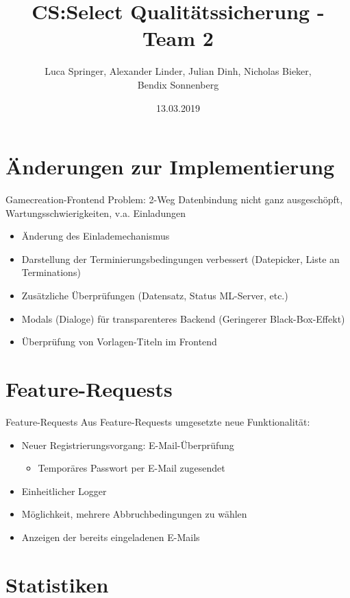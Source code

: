 \documentclass[xcolor=dvipsnames]{beamer}
\title[Team 2 - Implementierung]{CS:Select Qualitätssicherung - Team 2}
\author{Luca Springer, Alexander Linder, Julian Dinh, Nicholas Bieker,\\ Bendix Sonnenberg}
\date{13.03.2019}
\begin{document}
\begin{frame} %
  \titlepage
\end{frame}

\section{Änderungen zur Implementierung}
\begin{frame}{Gamecreation-Frontend}
    Problem: 2-Weg Datenbindung nicht ganz ausgeschöpft, Wartungsschwierigkeiten, v.a. Einladungen
    \begin{itemize}
        \item Änderung des Einlademechanismus
        \item Darstellung der Terminierungsbedingungen verbessert (Datepicker, Liste an Terminations)
        \item Zusätzliche Überprüfungen (Datensatz, Status ML-Server, etc.)
        \item Modals (Dialoge) für transparenteres Backend (Geringerer Black-Box-Effekt)
        \item Überprüfung von Vorlagen-Titeln im Frontend
    \end{itemize}
\end{frame}

\section{Feature-Requests}
\begin{frame}{Feature-Requests}
Aus Feature-Requests umgesetzte neue Funktionalität:
\begin{itemize}
	\item Neuer Registrierungsvorgang: E-Mail-Überprüfung
	\begin{itemize}
		\item Temporäres Passwort per E-Mail zugesendet
	\end{itemize}
	\item Einheitlicher Logger
	\item Möglichkeit, mehrere Abbruchbedingungen zu wählen
	\item Anzeigen der bereits eingeladenen E-Mails
\end{itemize}
\end{frame}

\renewcommand{\arraystretch}{1.5}

\section{Statistiken}
\end{document}
